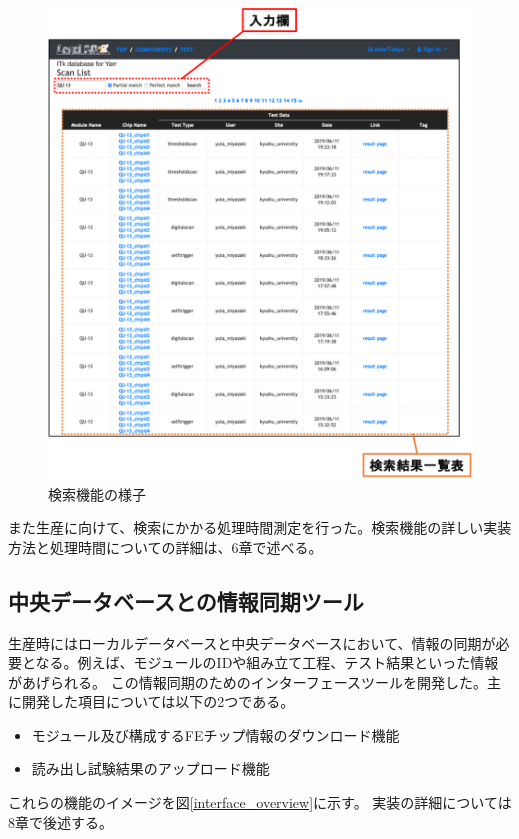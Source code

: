 \begin{figure}[bpt]\centering
\includegraphics[width=12cm]{webapp_search_function}
\caption[検索機能の様子]{検索機能の様子}
\label{webapp_search_function}
\end{figure}

また生産に向けて、検索にかかる処理時間測定を行った。検索機能の詳しい実装方法と処理時間についての詳細は、6章で述べる。

\newpage
\subsection{中央データベースとの情報同期ツール}
生産時にはローカルデータベースと中央データベースにおいて、情報の同期が必要となる。例えば、モジュールのIDや組み立て工程、テスト結果といった情報があげられる。
この情報同期のためのインターフェースツールを開発した。主に開発した項目については以下の2つである。

\begin{itemize}
  \item モジュール及び構成するFEチップ情報のダウンロード機能
  \item 読み出し試験結果のアップロード機能
\end{itemize}

これらの機能のイメージを図\ref{interface_overview}に示す。
実装の詳細については8章で後述する。

